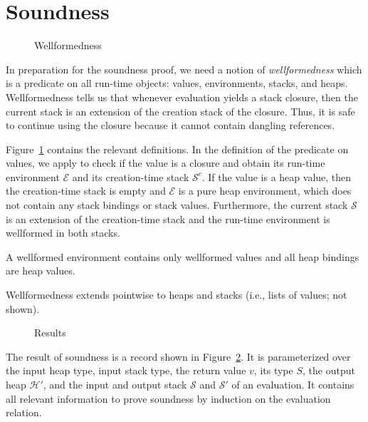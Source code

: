 \documentclass[sigplan,dvipsnames,screen]{acmart}
\begin{document}
\section{Soundness}
\label{sec:soundness}
\begin{figure}[tp]
  \Wellformed
  \caption{Wellformedness}
  \label{fig:wellformedness}
\end{figure}
In preparation for the soundness proof, we need a notion of
\emph{wellformedness} which is a predicate on all run-time objects:
values, environments, stacks, and heaps. Wellformedness tells us that whenever
evaluation yields a stack closure, then the current stack is an
extension of the creation stack of the closure. Thus, it is safe to
continue using the closure because it cannot contain dangling references.

Figure~\ref{fig:wellformedness} contains the relevant definitions. In
the definition of the {\AWellformed} predicate on values, we apply
 to check if the value
is a closure and obtain its run-time environment $\mathcal{E}$ and its
creation-time stack $\mathcal{S}^c$. If the value is a heap value,
then the creation-time stack is empty and $\mathcal{E}$ is a pure heap
environment, which does not contain any stack bindings or stack
values. Furthermore, the current stack $\mathcal{S}$ is an 
extension of the creation-time stack and the run-time environment is
wellformed in both stacks.

A wellformed environment {\AWellformedEnv} contains only wellformed values and all heap
bindings are heap values.

Wellformedness extends pointwise to heaps and stacks (i.e., lists
of values; not shown).

\begin{figure}[tp]
  \SoundnessResult
  \caption{Results}
  \label{fig:soundness-result}
\end{figure}
The result of soundness is a record shown in
Figure~\ref{fig:soundness-result}.
It is parameterized over the input heap type, input stack type, the
return value $v$, its type $S$, the output heap $\mathcal{H}'$, and
the input and output stack $\mathcal{S}$ and $\mathcal{S}'$ of an
evaluation. It contains all relevant information to prove soundness by
induction on the evaluation relation.
\end{document}
